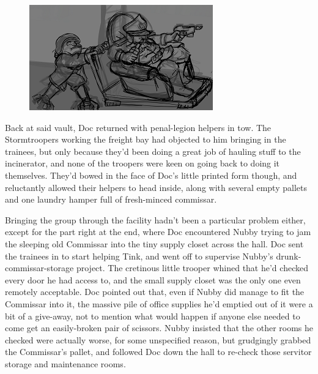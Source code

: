 \begin{figure}
	\begin{center}
		\includegraphics[width=\figwidth]{pics/21/81.png}
	\end{center}
\end{figure}
Back at said vault, Doc returned with penal-legion helpers in tow. 
The Stormtroopers working the freight bay had objected to him bringing in the trainees, but only because they'd been doing a great job of hauling stuff to the incinerator, and none of the troopers were keen on going back to doing it themselves. 
They'd bowed in the face of Doc's little printed form though, and reluctantly allowed their helpers to head inside, along with several empty pallets and one laundry hamper full of fresh-minced commissar.

Bringing the group through the facility hadn't been a particular problem either, except for the part right at the end, where Doc encountered Nubby trying to jam the sleeping old Commissar into the tiny supply closet across the hall. 
Doc sent the trainees in to start helping Tink, and went off to supervise Nubby's drunk-commissar-storage project. 
The cretinous little trooper whined that he'd checked every door he had access to, and the small supply closet was the only one even remotely acceptable. 
Doc pointed out that, even if Nubby did manage to fit the Commissar into it, the massive pile of office supplies he'd emptied out of it were a bit of a give-away, not to mention what would happen if anyone else needed to come get an easily-broken pair of scissors. 
Nubby insisted that the other rooms he checked were actually worse, for some unspecified reason, but grudgingly grabbed the Commissar's pallet, and followed Doc down the hall to re-check those servitor storage and maintenance rooms.

